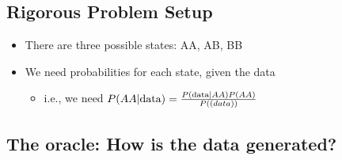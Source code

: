 \documentclass[10pt]{article}
\begin{document}
\subsection*{Rigorous Problem Setup}
\begin{itemize}
    \item There are three possible states: AA, AB, BB
    \item We need probabilities for each state, given the data
    \begin{itemize}
        \item i.e., we need $P(AA \vert \text{data}) = \frac{P(\text{data} \vert AA) P(AA)}{P(\text(data))}$
    \end{itemize}  
\end{itemize}
\subsection*{The oracle: How is the data generated?}
\end{document}
